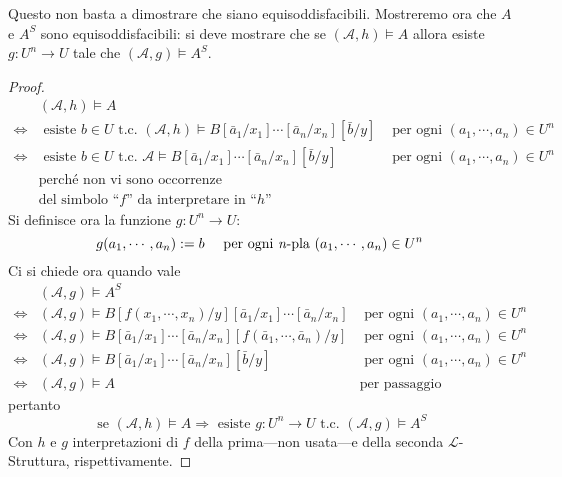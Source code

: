 Questo non basta a dimostrare che siano equisoddisfacibili. Mostreremo ora 
che $A$ e $A^S$ sono equisoddisfacibili: si deve mostrare che 
se $(\mathscr{A}, h) \models A$ allora esiste $g:U^n\rightarrow U$ tale che 
$(\mathscr{A}, g) \models A^S$. 
\begin{proof}
\begin{align*}
  & (\mathscr{A}, h) \models A \\
  \iff & \text{ esiste } b \in U \text{ t.c. } (\mathscr{A}, h) \models B[\bar a_1 / x_1] \cdots [\bar a_n / x_n][\bar b / y] & \text{ per ogni } (a_1, \cdots, a_n) \in U^n \\
  \iff & \text{ esiste } b \in U \text{ t.c. } \mathscr{A} \models B[\bar a_1 / x_1] \cdots [\bar a_n / x_n][\bar b / y] & \text{ per ogni } (a_1, \cdots, a_n) \in U^n \\
  & \text{perché non vi sono occorrenze} \\
  & \text{del simbolo ``} f \text{'' da interpretare in ``} h \text{''}
\end{align*}
Si definisce ora la funzione $g: U^n \rightarrow U$:
$$
g(a_1, \cdots, a_n) := b ~~~ \text{ per ogni \textit n-pla } (a_1, \cdots, a_n) \in U^n
$$
Ci si chiede ora quando vale 
\begin{align*}
& (\mathscr{A}, g) \models A^S \\
\iff & (\mathscr{A}, g) \models B[f(x_1, \cdots, x_n)/y][\bar a_1/x_1]\cdots[\bar a_n/x_n] & \text{ per ogni } (a_1, \cdots, a_n) \in U^n \\
  \iff & (\mathscr{A}, g) \models B[\bar a_1/x_1]\cdots[\bar a_n/x_n][f(\bar a_1, \cdots, \bar a_n)/y] & \text{ per ogni } (a_1, \cdots, a_n) \in U^n \\
  \iff & (\mathscr{A}, g) \models B[\bar a_1/x_1]\cdots[\bar a_n/x_n][\bar b/y] & \text{ per ogni } (a_1, \cdots, a_n) \in U^n \\
  \iff & (\mathscr{A}, g) \models A & \text{per passaggio precedente }
\end{align*}
pertanto
$$
\text{ se } (\mathscr{A}, h) \models A \Longrightarrow \text{ esiste } g: U^n \rightarrow U \text{ t.c. } (\mathscr{A}, g) \models A^S 
$$
Con $h$ e $g$ interpretazioni di $f$ della prima—non usata—e della seconda $\mathscr{L}$-Struttura, rispettivamente.
\end{proof}

